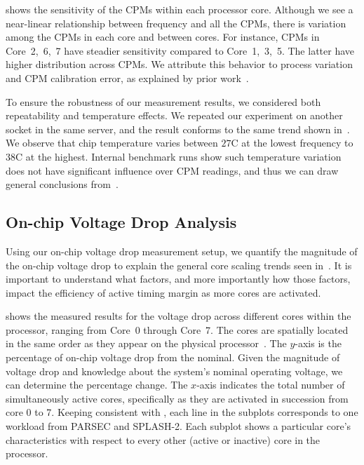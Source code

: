  shows the sensitivity of the CPMs within each processor core. Although we see a near-linear relationship between frequency and all the CPMs, there is variation among the CPMs in each core and between cores. For instance, CPMs in Core~2,~6,~7 have steadier sensitivity compared to Core~1,~3,~5. The latter have higher distribution across CPMs. We attribute this behavior to process variation and CPM calibration error, as explained by prior work~\cite{floyd2013runtime}.

To ensure the robustness of our measurement results, we considered both repeatability and temperature effects. We repeated our experiment on another socket in the same server, and the result conforms to the same trend shown in~. We observe that chip temperature varies between $27$\textdegree C at the lowest frequency to $38$\textdegree C at the highest. Internal benchmark runs show such temperature variation does not have significant influence over CPM readings, and thus we can draw general conclusions from~.

\subsection{On-chip Voltage Drop Analysis}
\label{sec:voltage:rootcause:vdrop-analysis}

Using our on-chip voltage drop measurement setup, we quantify the magnitude of the on-chip voltage drop to explain the general core scaling trends seen in~. It is important to understand what factors, and more importantly how those factors, impact the efficiency of active timing margin as more cores are activated. 

 shows the measured results for the voltage drop across different cores within the processor, ranging from Core~0 through Core~7. The cores are spatially located in the same order as they appear on the physical processor~\cite{zyuban2013ibm}. The $y$-axis is the percentage of on-chip voltage drop from the nominal. Given the magnitude of voltage drop and knowledge about the system's nominal operating voltage, we can determine the percentage change. The $x$-axis indicates the total number of simultaneously active cores, specifically as they are activated in succession from core 0 to 7. Keeping consistent with , each line in the subplots corresponds to one workload from PARSEC and SPLASH-2. Each subplot shows a particular core's characteristics with respect to every other (active or inactive) core in the processor. 

